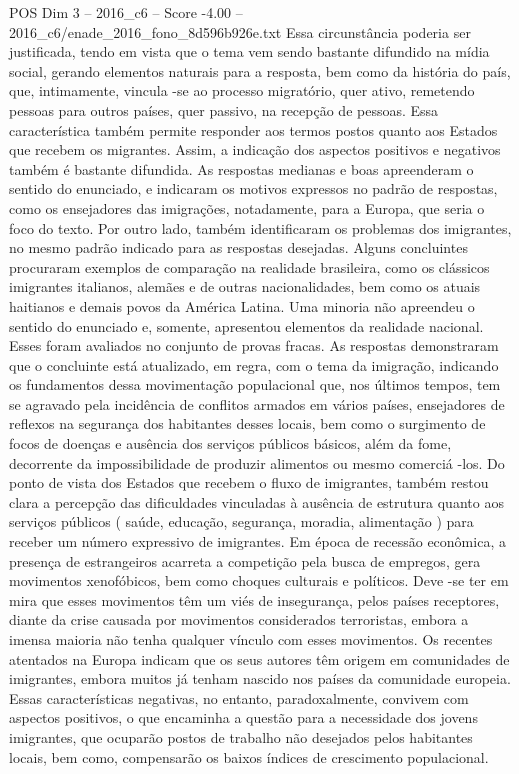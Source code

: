 \begin{textsample}{POS Dim 3 – 2016\_c6 – Score -4.00 – 2016\_c6/enade\_2016\_fono\_8d596b926e.txt}
Essa circunstância poderia ser justificada, tendo em vista que o tema vem sendo bastante difundido na mídia social, gerando elementos naturais para a resposta, bem como da história do país, que, intimamente, vincula -se ao processo migratório, quer ativo, remetendo pessoas para outros países, quer passivo, na recepção de pessoas.
Essa característica também permite responder aos termos postos quanto aos Estados que recebem os migrantes.
Assim, a indicação dos aspectos positivos e negativos também é bastante difundida.
As respostas medianas e boas apreenderam o sentido do enunciado, e indicaram os motivos expressos no padrão de respostas, como os ensejadores das imigrações, notadamente, para a Europa, que seria o foco do texto.
Por outro lado, também identificaram os problemas dos imigrantes, no mesmo padrão indicado para as respostas desejadas.
Alguns concluintes procuraram exemplos de comparação na realidade brasileira, como os clássicos imigrantes italianos, alemães e de outras nacionalidades, bem como os atuais haitianos e demais povos da América Latina.
Uma minoria não apreendeu o sentido do enunciado e, somente, apresentou elementos da realidade nacional.
Esses foram avaliados no conjunto de provas fracas.
As respostas demonstraram que o concluinte está atualizado, em regra, com o tema da imigração, indicando os fundamentos dessa movimentação populacional que, nos últimos tempos, tem se agravado pela incidência de conflitos armados em vários países, ensejadores de reflexos na segurança dos habitantes desses locais, bem como o surgimento de focos de doenças e ausência dos serviços públicos básicos, além da fome, decorrente da impossibilidade de produzir alimentos ou mesmo comerciá -los.
Do ponto de vista dos Estados que recebem o fluxo de imigrantes, também restou clara a percepção das dificuldades vinculadas à ausência de estrutura quanto aos serviços públicos ( saúde, educação, segurança, moradia, alimentação ) para receber um número expressivo de imigrantes.
Em época de recessão econômica, a presença de estrangeiros acarreta a competição pela busca de empregos, gera movimentos xenofóbicos, bem como choques culturais e políticos.
Deve -se ter em mira que esses movimentos têm um viés de insegurança, pelos países receptores, diante da crise causada por movimentos considerados terroristas, embora a imensa maioria não tenha qualquer vínculo com esses movimentos.
Os recentes atentados na Europa indicam que os seus autores têm origem em comunidades de imigrantes, embora muitos já tenham nascido nos países da comunidade europeia.
Essas características negativas, no entanto, paradoxalmente, convivem com aspectos positivos, o que encaminha a questão para a necessidade dos jovens imigrantes, que ocuparão postos de trabalho não desejados pelos habitantes locais, bem como, compensarão os baixos índices de crescimento populacional.

\end{textsample}

